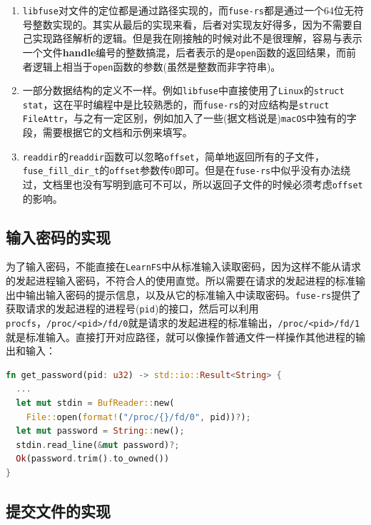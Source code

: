 \documentclass[12pt, UTF8]{article}
\begin{document}
\begin{enumerate}
  \item \lstinline|libfuse|对文件的定位都是通过路径实现的，而\lstinline|fuse-rs|都是通过一个64位无符号整数实现的。其实从最后的实现来看，后者对实现友好得多，因为不需要自己实现路径解析的逻辑。但是我在刚接触的时候对此不是很理解，容易与表示一个文件\textbf{handle}编号的整数搞混，后者表示的是\lstinline|open|函数的返回结果，而前者逻辑上相当于\lstinline|open|函数的参数(虽然是整数而非字符串)。
  \item 一部分数据结构的定义不一样。例如\lstinline|libfuse|中直接使用了\lstinline|Linux|的\lstinline|struct stat|，这在平时编程中是比较熟悉的，而\lstinline|fuse-rs|的对应结构是\lstinline|struct FileAttr|，与之有一定区别，例如加入了一些(据文档说是)\lstinline|macOS|中独有的字段，需要根据它的文档和示例来填写。
  \item \lstinline|readdir|的\lstinline|readdir|函数可以忽略\lstinline|offset|，简单地返回所有的子文件，\lstinline|fuse_fill_dir_t|的\lstinline|offset|参数传0即可。但是在\lstinline|fuse-rs|中似乎没有办法绕过，文档里也没有写明到底可不可以，所以返回子文件的时候必须考虑\lstinline|offset|的影响。
\end{enumerate}

\subsection{输入密码的实现}

为了输入密码，不能直接在\lstinline|LearnFS|中从标准输入读取密码，因为这样不能从请求的发起进程输入密码，不符合人的使用直觉。所以需要在请求的发起进程的标准输出中输出输入密码的提示信息，以及从它的标准输入中读取密码。\lstinline|fuse-rs|提供了获取请求的发起进程的进程号(\lstinline|pid|)的接口，然后可以利用\lstinline|procfs|，\lstinline|/proc/<pid>/fd/0|就是请求的发起进程的标准输出，\lstinline|/proc/<pid>/fd/1|就是标准输入。直接打开对应路径，就可以像操作普通文件一样操作其他进程的输出和输入：

\begin{lstlisting}[language = Rust]
fn get_password(pid: u32) -> std::io::Result<String> {
  ...
  let mut stdin = BufReader::new(
    File::open(format!("/proc/{}/fd/0", pid))?);
  let mut password = String::new();
  stdin.read_line(&mut password)?;
  Ok(password.trim().to_owned())
}
\end{lstlisting}

\subsection{提交文件的实现}
\end{document}
